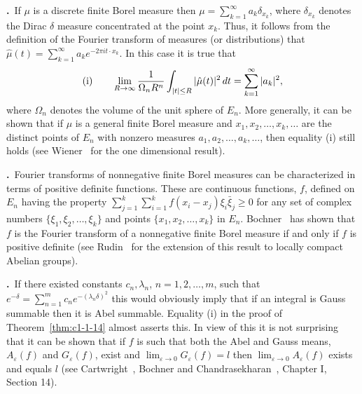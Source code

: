 \label{eq:c1-4-7}\textbf{\theequation.}~If $\mu$ is a
discrete finite Borel measure then
$\mu = \sum_{k=1}^{\infty} a_{k}\delta_{x_{k}}$, where $\delta_{x_{k}}$
denotes the Dirac $\delta$ measure concentrated at the point $x_{k}$. Thus, it
follows from the definition of the Fourier transform of measures (or
distributions) that
$\hat{\mu}(t) = \sum_{k=1}^{\infty} a_{k}e^{-2\pi i t \cdot x_{k}}$. In this
case it is true that
\[
\textup{(i)}\qquad
\lim_{R\to\infty}\frac{1}{\Omega_{n}R^{n}}\int_{|t|\leq R}|\hat{\mu}(t)|^{2}\,dt
=\sum_{k=1}^{\infty}|a_{k}|^{2},
\]
where $\Omega_{n}$ denotes the volume of the unit sphere of $E_{n}$. More
generally, it can be shown that if $\mu$ is a general finite Borel measure and
$x_{1}, x_{2}, \ldots, x_{k}, \ldots$ are the distinct points of $E_{n}$ with
nonzero measures $a_{1}, a_{2}, \ldots, a_{k}, \ldots$, then equality (i) still
holds (see Wiener~\cite{Wiener1} for the one dimensional result).

\label{eq:c1-4-8}\textbf{\theequation.}~Fourier
transforms of nonnegative finite Borel measures can be characterized in terms
of positive definite functions. These are continuous functions, $f$, defined on
$E_{n}$ having the property
$\sum_{j=1}^{k} \sum_{i=1}^{k} f(x_{i} - x_{j})\xi_{i}\bar{\xi}_{j} \geq 0$
for any set of complex numbers $\{\xi_{1}, \xi_{2}, \ldots, \xi_{k}\}$ and
points $\{x_{1}, x_{2}, \ldots, x_{k}\}$ in $E_{n}$.
Bochner~\cite{Bochner3} has shown that $f$ is the Fourier transform of a
nonnegative finite Borel measure if and only if $f$ is positive definite (see
Rudin~\cite{Rudin1} for the extension of this result to locally compact
Abelian groups).

\label{eq:c1-4-9}\textbf{\theequation.}~If there
existed constants $c_{n}, \lambda_{n}$, $n = 1, 2, \ldots, m$, such that
$e^{-\delta} = \sum_{n=1}^{m} c_{n}e^{-(\lambda_{n}\delta)^{2}}$ this would
obviously imply that if an integral is Gauss summable then it is Abel
summable. Equality (i) in the proof of Theorem~\ref{thm:c1-1-14} almost
asserts this. In view of this it is not surprising that it can be shown that
if $f$ is such that both the Abel and Gauss means, $A_{\varepsilon}(f)$ and
$G_{\varepsilon}(f)$, exist and $\lim_{\varepsilon\to0} G_{\varepsilon}(f) = l$
then $\lim_{\varepsilon\to0} A_{\varepsilon}(f)$ exists and equals $l$ (see
Cartwright~\cite{Cartwright1}, Bochner and
Chandrasekharan~\cite{BochnerChandrasekharan1}, Chapter I, Section 14).

